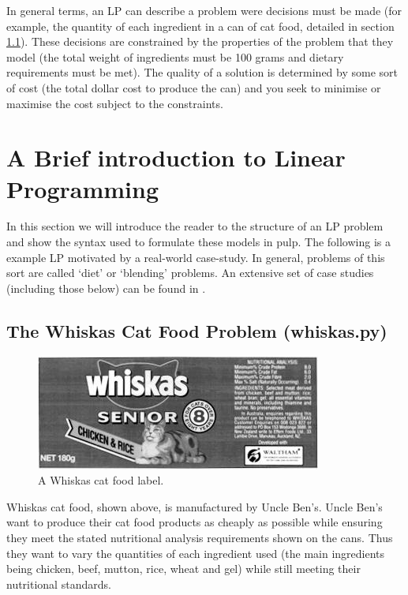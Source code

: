\documentclass[a4paper,oneside]{arlimsTPPM}
\begin{document}
In general terms, an LP can describe a problem were decisions must be made (for example, the quantity of each ingredient in a can of cat food, detailed in section \ref{sec:whiskas}). These decisions are constrained by the properties of the problem that they model (the total weight of ingredients must be 100 grams and dietary requirements must be met). The quality of a solution is determined by some sort of cost (the total dollar cost to produce the can) and you seek to minimise or maximise the cost subject to the constraints.



\section{A Brief introduction to Linear Programming}
\label{sect:LP}

In this section we will introduce the reader to the structure of an LP problem and show the syntax used to formulate these models in pulp. The following is a example LP motivated by a real-world case-study. In general, problems of this sort are called `diet' or `blending' problems. An extensive set of case studies (including those below) can be found in \cite{pulpwiki}.

\subsection{The Whiskas Cat Food Problem (whiskas.py)}
\label{sec:whiskas}

\begin{figure}[h]
 \centering
\includegraphics{images/whiskas_label.jpg} 
\caption{A Whiskas cat food label.}
\end{figure}
Whiskas cat food, shown above, is manufactured by Uncle Ben's. Uncle Ben's want to produce their cat food products as cheaply as possible while ensuring they meet the stated nutritional analysis requirements shown on the cans. Thus they want to vary the quantities of each ingredient used (the main ingredients being chicken, beef, mutton, rice, wheat and gel) while still meeting their nutritional standards. 
\end{document}
